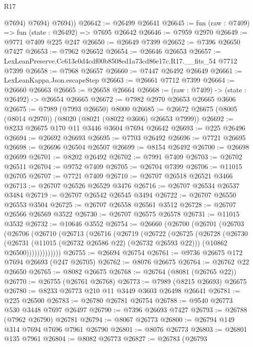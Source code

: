 \begin{lexlean}{R17}
\begin{coremodule}
            @7694)
          @7694)
        @7694))
@26642 := @26499 @26641
@26645 := fun (raw : @7409) => fun (state : @26492) => @7695 @26642
@26646 := @7959 @2970
@26649 := @9771 @7409 @225 @247
@26650 := @26649 @7399
@26652 := @7396 @26650 @7427
@26653 := @7962 @26652
@26654 := @26646 @26653
@26657 := LexLeanPreserve.Cc613c0d4cdf00b8508ed1a73cd86e17c.R17.__fits_54 @7712 @7399
@26658 := @7968 @26657
@26660 := @7447 @26492 @26649
@26661 := LexLeanKappa.Json.escapeStep
@26663 := @26661 @7712 @7399
@26664 := @26660 @26663
@26665 := @26658 @26664
@26668 := (raw : @7409) -> (state : @26492) -> @26654 @26665
@26672 := @7982 @2970 @26653 @26665 @3606
@26675 := @7989 (@7993 @26650) @8000
@26685 := @26672 @26675 (@8005 (@8014 @2970)) (@8020 (@8021 (@8022 @3606) @26653 @7999))
@26692 := @8233 @26675 @170 @11 @3446 @3604 @7694 @26642
@26693 := @225 @26496
@26694 := @26692 @26693
@26695 := @7703 @26492
@26696 := @7721 @26695
@26698 := @26696 @26504 @26507
@26699 := @8154 @26492
@26700 := @26698 @26699
@26701 := @8202 @26492
@26702 := @7991 @7409
@26703 := @26702 @26511
@26704 := @9752 @7409
@26705 := @26704 @7399
@26706 := @11015 @26705
@26707 := @7721 @7409
@26710 := @26707 @26518 @26521 @3466
@26713 := @26707 @26526 @26529 @3476
@26716 := @26707 @26534 @26537 @3484
@26719 := @26707 @26542 @26545 @3494
@26722 := @26707 @26550 @26553 @3504
@26725 := @26707 @26558 @26561 @3512
@26728 := @26707 @26566 @26569 @3522
@26730 := @26707 @26575 @26578
@26731 := @11015 @3532
@26732 := @10646 @3552
@26754 := @26660
    (@26700
      (@26701
        (@26703
          (@26706
            (@26710
              (@26713
                (@26716
                  (@26719
                    (@26722
                      (@26725
                        (@26728
                          (@26730
                            (@26731 (@11015 (@26732 @26586 @22) (@26732 @26593 @22)))
                            (@10862 @26500)))))))))))))
@26755 := @26694 @26754
@26761 := @9736 @26675 @172 @7694 @26693 (@247 @26705)
@26762 := @8076 @26675
@26764 := @26762 @22 @26650
@26765 := @8082 @26675
@26768 := @26764 (@8081 (@26765 @22))
@26770 := @26755 (@26761 @26768)
@26773 := @7989 (@8215 @26693) @26675
@26780 := @8233 @26773 @210 @11 @3449 @3603 @26498 @26641
@26781 := @225 @26500
@26783 := @26780 @26781 @26754
@26788 := @9540 @26773 @530 @3448 @7697 @26497
@26790 := @7396 @26693 @7427
@26793 := @26788 (@7962 @26790) @26781
@26794 := @8067 @26773
@26800 := @26794 @149 @314 @7694 @7696 @7961 @26790
@26801 := @8076 @26773
@26803 := @26801 @135 @7961
@26804 := @8082 @26773
@26827 := @26783
    (@26793

\end{coremodule}
\end{lexlean}
